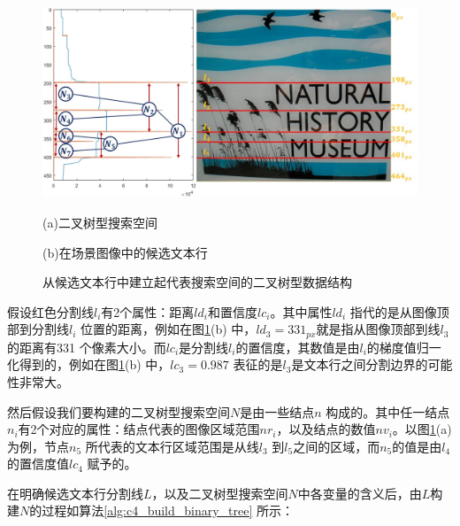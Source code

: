     \begin{figure}[htbp]
    \centering
    \includegraphics[width=\textwidth]{./figures/c4_binary_tree_construction.jpg}
    \begin{minipage}[t]{0.40\linewidth}
    \centerline{\small (a)二叉树型搜索空间}
    \end{minipage}
    \begin{minipage}[t]{0.51\linewidth}
    \centerline{\small(b)在场景图像中的候选文本行}
    \end{minipage}
    \caption{从候选文本行中建立起代表搜索空间的二叉树型数据结构}
    \label{fig.c4_binary_tree_construction}
    \end{figure}

    假设红色分割线$l_i$有2个属性：距离$ld_i$和置信度$lc_i$。其中属性$ld_i$ 指代的是从图像顶部到分割线$l_i$ 位置的距离，例如在图\ref{fig.c4_binary_tree_construction}(b) 中，$ld_3=331_{px}$就是指从图像顶部到线$l_3$的距离有331 个像素大小。而$lc_i$是分割线$l_i$的置信度，其数值是由$l_i$的梯度值归一化得到的，例如在图\ref{fig.c4_binary_tree_construction}(b) 中，$lc_3=0.987$ 表征的是$l_3$是文本行之间分割边界的可能性非常大。

    然后假设我们要构建的二叉树型搜索空间$N$是由一些结点$n$ 构成的。其中任一结点$n_i$有2个对应的属性：结点代表的图像区域范围$nr_i$，以及结点的数值$nv_i$。以图\ref{fig.c4_binary_tree_construction}(a) 为例，节点$n_5$ 所代表的文本行区域范围是从线$l_3$ 到$l_5$之间的区域，而$n_5$的值是由$l_4$ 的置信度值$lc_4$ 赋予的。

    在明确候选文本行分割线$L$，以及二叉树型搜索空间$N$中各变量的含义后，由$L$构建$N$的过程如算法\ref{alg:c4_build_binary_tree} 所示：

